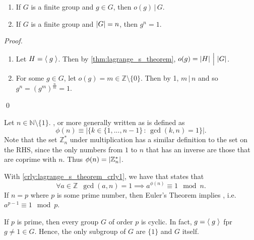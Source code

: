 \begin{crly}
\label{crly:lagrange_s_theorem_crly1}
  \begin{enumerate}
    \item If $G$ is a finite group and $g \in G$, then $o(g) \, \Big| \, G$.
    \item If $G$ is a finite group and $\left|G\right| = n$, then $g^n = 1$.
  \end{enumerate}
\end{crly}

\begin{proof}
  \begin{enumerate}
    \item Let $H = \langle \; g \; \rangle$. Then by \autoref{thm:lagrange_s_theorem}, $o(g) = \left|H\right| \, \Big| \, \left|G\right|$.

    \item For some $g \in G$, let $o(g) = m \in \mathbb{Z} \setminus \{0\}$. Then by 1, $m \, | \, n$ and so $g^n = (g^m)^{\frac{n}{m}} = 1$.
  \end{enumerate}\qed
\end{proof}

\begin{note}
  Let $n \in \mathbb{N} \setminus \{1\}$. , or more generally written as  is defined as
  \begin{equation}\label{eq:euler_s_totient_function}
    \phi(n) \equiv \Big| \big\{k \in \{1, ..., n - 1\} \, : \, \gcd(k, n) = 1 \big\} \Big|.
  \end{equation}
  Note that the set $\mathbb{Z}_n^*$ under multiplication has a similar definition to the set on the RHS, since the only numbers from $1$ to $n$ that has an inverse are those that are coprime with $n$. Thus $\phi(n) = \left|\mathbb{Z}_n^*\right|$.

  With \cref{crly:lagrange_s_theorem_crly1}, we have  that states that
  \begin{equation}\label{eq:euler_s_theorem}
    \forall a \in \mathbb{Z} \enspace \gcd(a, n) = 1 \implies a^{\phi(n)} \equiv 1 \mod n.
  \end{equation}
  If $n = p$ where $p$ is some prime number, then Euler's Theorem implies , i.e. $a^{p - 1} \equiv 1 \mod p$.
\end{note}

\begin{crly}
\label{crly:lagrange_s_theorem_crly2}
  If $p$ is prime, then every group $G$ of order $p$ is cyclic. In fact, $g = \langle \; g \; \rangle$ fpr $g \neq 1 \in G$. Hence, the only subgroup of $G$ are $\{1\}$ and $G$ itself.
\end{crly}


